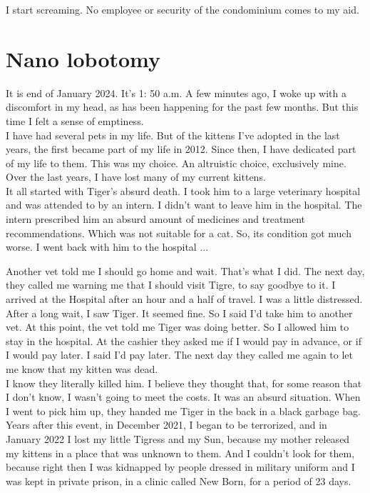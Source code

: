 \documentclass[11pt]{book}
\begin{document}
\noindent I start screaming. No employee or security of the condominium comes to my aid. 

\chapter{Nano lobotomy}

\noindent It is end of January 2024. It's 1: 50 a.m. A few minutes ago, I woke up with a discomfort in my head, as has been happening for the past few months. But this time I felt a sense of emptiness. \\

\noindent I have had several pets in my life. But of the kittens I've adopted in the last years, the first became part of my life in 2012. Since then, I have dedicated part of my life to them. This was my choice. An altruistic choice, exclusively mine. \\

\noindent Over the last years, I have lost many of my current kittens. \\

\noindent It all started with Tiger's absurd death. I took him to a large veterinary hospital and was attended to by an intern. I didn't want to leave him in the hospital. The intern prescribed him an absurd amount of medicines and treatment recommendations. Which was not suitable for a cat. So, its condition got much worse. I went back with him to the hospital ... 

\noindent Another vet told me I should go home and wait. That's what I did. The next day, they called me warning me that I should visit Tigre, to say goodbye to it. I arrived at the Hospital after an hour and a half of travel. I was a little distressed. After a long wait, I saw Tiger. It seemed fine. So I said I'd take him to another vet. At this point, the vet told me Tiger was doing better. So I allowed him to stay in the hospital. At the cashier they asked me if I would pay in advance, or if I would pay later. I said I'd pay later. The next day they called me again to let me know that my kitten was dead. \\

\noindent I know they literally killed him. I believe they thought that, for some reason that I don't know, I wasn't going to meet the costs. It was an absurd situation. When I went to pick him up, they handed me Tiger in the back in a black garbage bag. \\

\noindent Years after this event, in December 2021, I began to be terrorized, and in January 2022 I lost my little Tigress and my Sun, because my mother released my kittens in a place that was unknown to them. And I couldn't look for them, because right then I was kidnapped by people dressed in military uniform and I was kept in private prison, in a clinic called New Born, for a period of 23 days. \\
\end{document}
